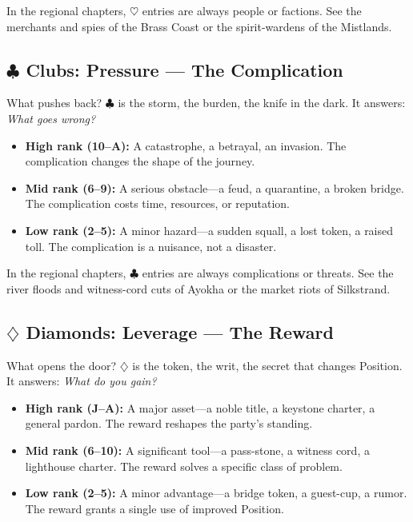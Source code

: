 \documentclass[11pt,letterpaper,twoside]{book}
\begin{document}
In the regional chapters, $\heartsuit$ entries are always people or factions. See the merchants and spies of the Brass Coast or the spirit-wardens of the Mistlands.

\subsection*{$\clubsuit$ Clubs: Pressure --- The Complication}

What pushes back? $\clubsuit$ is the storm, the burden, the knife in the dark. It answers: \textit{What goes wrong?}

\begin{itemize}
    \item \textbf{High rank (10--A):} A catastrophe, a betrayal, an invasion. The complication changes the shape of the journey.
    \item \textbf{Mid rank (6--9):} A serious obstacle---a feud, a quarantine, a broken bridge. The complication costs time, resources, or reputation.
    \item \textbf{Low rank (2--5):} A minor hazard---a sudden squall, a lost token, a raised toll. The complication is a nuisance, not a disaster.
\end{itemize}

In the regional chapters, $\clubsuit$ entries are always complications or threats. See the river floods and witness-cord cuts of Ayokha or the market riots of Silkstrand.

\subsection*{$\diamondsuit$ Diamonds: Leverage --- The Reward}

What opens the door? $\diamondsuit$ is the token, the writ, the secret that changes Position. It answers: \textit{What do you gain?}

\begin{itemize}
    \item \textbf{High rank (J--A):} A major asset---a noble title, a keystone charter, a general pardon. The reward reshapes the party's standing.
    \item \textbf{Mid rank (6--10):} A significant tool---a pass-stone, a witness cord, a lighthouse charter. The reward solves a specific class of problem.
    \item \textbf{Low rank (2--5):} A minor advantage---a bridge token, a guest-cup, a rumor. The reward grants a single use of improved Position.
\end{itemize}
\end{document}
